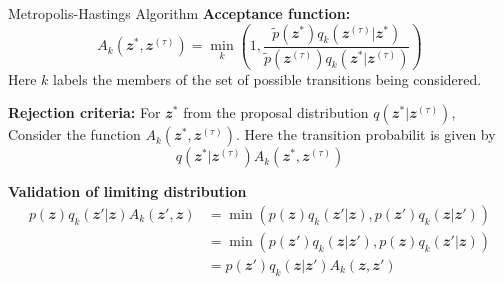 \documentclass{bredelebeamer}
\begin{document}
\begin{frame}{Metropolis-Hastings Algorithm}
  \textbf{Acceptance function:}
  \begin{equation}
    A_k(\mathbfit{z}^{*}, \mathbfit{z}^{(\tau)})
    = \min_k
    \left(
      1,
      \frac{\tilde{p}(\mathbfit{z}^{*}) q_k(\mathbfit{z}^{(\tau)}|\mathbfit{z}^{*})}
      {\tilde{p}(\mathbfit{z}^{(\tau)}) q_k(\mathbfit{z}^{*}|\mathbfit{z}^{(\tau)})}
    \right)
  \end{equation}
  Here $k$ labels the members of the set of possible transitions being
  considered.

  \textbf{Rejection criteria:}
  For $\mathbfit{z}^{*}$ from the proposal distribution $q(\mathbfit{z}^{*}|\mathbfit{z}^{(\tau)})$,
  Consider the function $A_k(\mathbfit{z}^{*}, \mathbfit{z}^{(\tau)})$.
  Here the transition probabilit is given by
  \begin{equation}
    q(\mathbfit{z}^{*}|\mathbfit{z}^{(\tau)})A_k(\mathbfit{z}^{*}, \mathbfit{z}^{(\tau)})
  \end{equation}

  \textbf{Validation of limiting distribution}
  \begin{equation}
    \begin{split}
      p(\mathbfit{z}) q_k(\mathbfit{z}'|\mathbfit{z}) A_k(\mathbfit{z}', \mathbfit{z})
      &= \min(p(\mathbfit{z}) q_k(\mathbfit{z}'|\mathbfit{z}), p(\mathbfit{z}') q_k(\mathbfit{z}|\mathbfit{z}'))  \\
      &= \min(p(\mathbfit{z}') q_k(\mathbfit{z}|\mathbfit{z}'), p(\mathbfit{z}) q_k(\mathbfit{z}'|\mathbfit{z}))  \\
      &= p(\mathbfit{z}') q_k(\mathbfit{z}|\mathbfit{z}') A_k(\mathbfit{z}, \mathbfit{z}')
    \end{split}
  \end{equation}
\end{frame}
\end{document}
